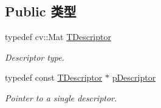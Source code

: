 \subsection*{Public 类型}
\begin{DoxyCompactItemize}
\item 
\hypertarget{classDBoW2_1_1FORB_aef9b966d0293836fab9f55f1799ce0ed}{typedef cv\-::\-Mat \hyperlink{classDBoW2_1_1FORB_aef9b966d0293836fab9f55f1799ce0ed}{T\-Descriptor}}\label{classDBoW2_1_1FORB_aef9b966d0293836fab9f55f1799ce0ed}

\begin{DoxyCompactList}\small\item\em Descriptor type. \end{DoxyCompactList}\item 
\hypertarget{classDBoW2_1_1FORB_ab52a6568044027cf30c8ac1514fed1a6}{typedef const \hyperlink{classDBoW2_1_1FORB_aef9b966d0293836fab9f55f1799ce0ed}{T\-Descriptor} $\ast$ \hyperlink{classDBoW2_1_1FORB_ab52a6568044027cf30c8ac1514fed1a6}{p\-Descriptor}}\label{classDBoW2_1_1FORB_ab52a6568044027cf30c8ac1514fed1a6}

\begin{DoxyCompactList}\small\item\em Pointer to a single descriptor. \end{DoxyCompactList}\end{DoxyCompactItemize}
